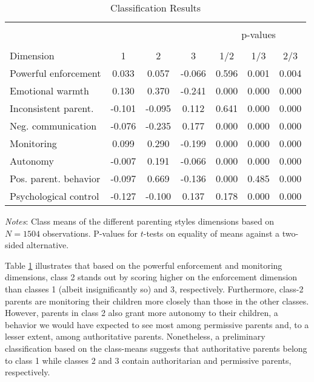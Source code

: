 \begin{table}[!htbp]
	\centering
	\begin{threeparttable}
		\caption{Classification Results}
		\label{tab:class}
		\begin{tabular}{lcccccc}
			\hline \hline\\[-1.8ex] 
			&    &    &    &\multicolumn{3}{c}{p-values} \\ 
			\cline{5-7} \\[-1.8ex]Dimension & 1 & 2 & 3 & 1/2 & 1/3 & 2/3 \\ 
			\midrule
			Powerful enforcement & 0.033 & 0.057 & -0.066 & 0.596 & 0.001 & 0.004 \\ 
			Emotional warmth & 0.130 & 0.370 & -0.241 & 0.000 & 0.000 & 0.000 \\ 
			Inconsistent parent. & -0.101 & -0.095 & 0.112 & 0.641 & 0.000 & 0.000 \\ 
			Neg. communication & -0.076 & -0.235 & 0.177 & 0.000 & 0.000 & 0.000 \\ 
			Monitoring & 0.099 & 0.290 & -0.199 & 0.000 & 0.000 & 0.000 \\ 
			Autonomy & -0.007 & 0.191 & -0.066 & 0.000 & 0.000 & 0.000 \\ 
			Pos. parent. behavior & -0.097 & 0.669 & -0.136 & 0.000 & 0.485 & 0.000 \\ 
			Psychological control & -0.127 & -0.100 & 0.137 & 0.178 & 0.000 & 0.000 \\ 
			\hline \bottomrule
		\end{tabular}
		\begin{tablenotes}
			\small
			\item \textit{Notes}: Class means of the different parenting styles dimensions based on $N = 1504$ observations. P-values for $t$-tests on equality of means against a two-sided alternative.
		\end{tablenotes}
	\end{threeparttable}
\end{table}
%
Table \ref{tab:class} illustrates that based on the powerful enforcement and monitoring dimensions, class 2 stands out by scoring higher on the enforcement dimension than classes 1 (albeit insignificantly so) and 3, respectively. Furthermore, class-2 parents are monitoring their children more closely than those in the other classes. However, parents in class 2 also grant more autonomy to their children, a behavior we would have expected to see most among permissive parents and, to a lesser extent, among authoritative parents. Nonetheless, a preliminary classification based on the class-means suggests that authoritative parents belong to class 1 while classes 2 and 3 contain authoritarian and permissive parents, respectively. 

